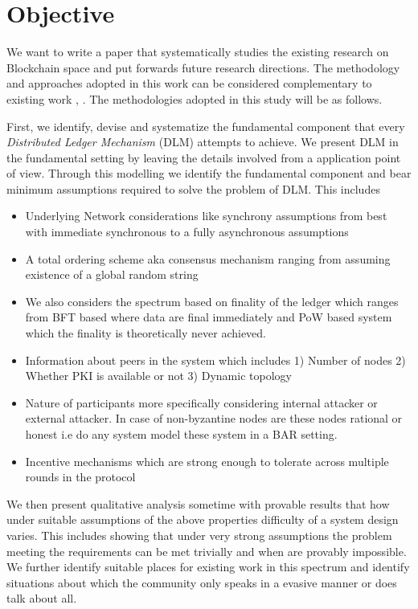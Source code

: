 \section{Objective}
\label{sec:objective}
We want to write a paper that systematically studies the existing research on Blockchain space and put forwards future research directions. The methodology and approaches adopted in this work can be considered  complementary to existing work  \cite{bano2017consensus}, \cite{joshi2018survey}. The methodologies adopted in this study will be as follows.

First, we identify, devise and systematize the fundamental component that every {\em Distributed Ledger Mechanism} (DLM) attempts to achieve. We present DLM in the fundamental setting by leaving the details involved from a application point of view. Through this modelling we identify the fundamental component and bear minimum assumptions required to solve the problem of DLM. This includes

\begin{itemize}
    \item Underlying Network considerations like synchrony assumptions from best with immediate synchronous to a fully asynchronous assumptions
    \item A total ordering scheme aka consensus mechanism ranging from assuming existence of a global random string
    \item We also considers the spectrum based on finality of the ledger which ranges from BFT based where data are final immediately and PoW based system which the finality is theoretically never achieved.
    \item Information about peers in the system which includes 1) Number of nodes 2) Whether PKI is available or not 3) Dynamic topology
    \item Nature of participants more specifically considering internal attacker or external attacker. In case of non-byzantine nodes are these nodes rational or honest i.e do any system model these system in a BAR setting.
    \item Incentive mechanisms which are strong enough to tolerate across multiple rounds in the protocol
\end{itemize}

We then present qualitative analysis sometime with provable results that how under suitable assumptions of the above properties difficulty of a system design varies. This includes showing that under very strong assumptions the problem meeting the requirements can be met trivially and when are provably impossible. We further identify suitable places for existing work in this spectrum and identify situations about which the community only speaks in a evasive manner or does talk about all. 

